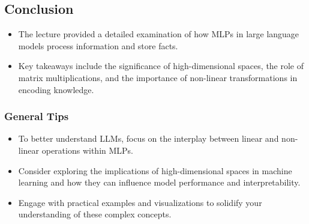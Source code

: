 \documentclass{article}
\begin{document}
\subsection*{Conclusion}
\begin{itemize}
\item The lecture provided a detailed examination of how MLPs in large language models process information and store facts.
\item Key takeaways include the significance of high-dimensional spaces, the role of matrix multiplications, and the importance of non-linear transformations in encoding knowledge.
\end{itemize}

\subsubsection*{General Tips}
\begin{itemize}
\item To better understand LLMs, focus on the interplay between linear and non-linear operations within MLPs.
\item Consider exploring the implications of high-dimensional spaces in machine learning and how they can influence model performance and interpretability.
\item Engage with practical examples and visualizations to solidify your understanding of these complex concepts.
\end{itemize}
\end{document}
